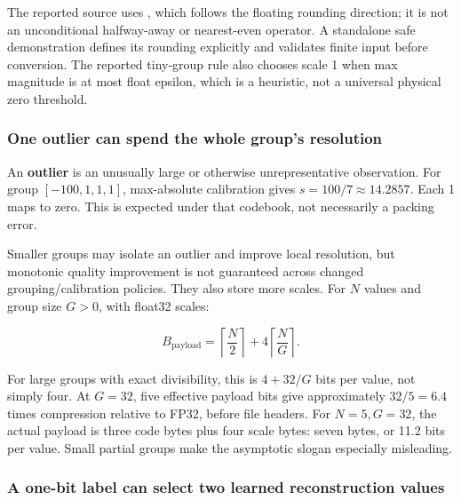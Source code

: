 The reported source uses , which follows the floating rounding direction; it is not an unconditional halfway-away or nearest-even operator. A standalone safe demonstration defines its rounding explicitly and validates finite input before conversion. The reported tiny-group rule also chooses scale 1 when max magnitude is at most float epsilon, which is a heuristic, not a universal physical zero threshold.

\subsubsection{One outlier can spend the whole group's resolution}\label{01-foundations-i-ch001-one-outlier-can-spend-the-whole-groups-resolution}

\hypertarget{01-foundations-i-ch001-one-outlier-can-spend-the-whole-groups-resolution}{}

An \textbf{outlier} is an unusually large or otherwise unrepresentative observation. For group \([-100,1,1,1]\), max-absolute calibration gives \(s=100/7\approx14.2857\). Each 1 maps to zero. This is expected under that codebook, not necessarily a packing error.

Smaller groups may isolate an outlier and improve local resolution, but monotonic quality improvement is not guaranteed across changed grouping/calibration policies. They also store more scales. For \(N\) values and group size \(G>0\), with float32 scales:

\[
B_{\mathrm{payload}}=
\left\lceil\frac N2\right\rceil
+4\left\lceil\frac NG\right\rceil.
\]

For large groups with exact divisibility, this is \(4+32/G\) bits per value, not simply four. At \(G=32\), five effective payload bits give approximately \(32/5=6.4\) times compression relative to FP32, before file headers. For \(N=5,G=32\), the actual payload is three code bytes plus four scale bytes: seven bytes, or 11.2 bits per value. Small partial groups make the asymptotic slogan especially misleading.

\subsubsection{A one-bit label can select two learned reconstruction values}\label{01-foundations-i-ch001-a-one-bit-label-can-select-two-learned-reconstruction-values}

\hypertarget{01-foundations-i-ch001-a-one-bit-label-can-select-two-learned-reconstruction-values}{}

